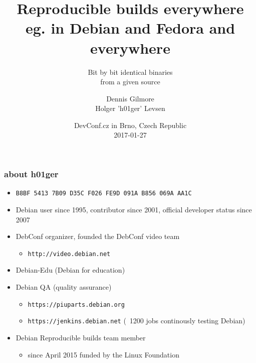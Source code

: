 \documentclass[14pt]{beamer}
\title[Reproducible Builds and Fedora]{Reproducible
builds everywhere \\ eg. in Debian and Fedora and everywhere}
\subtitle{Bit by bit identical binaries \\
from a given source}
\author[Dennis and h01ger]{%
   \texorpdfstring{
            \centering
            Dennis Gilmore\\
            Holger 'h01ger' Levsen
   }{Dennis and h01ger}}
\date[DevConf.cz]{%
 DevConf.cz in Brno, Czech Republic\\
 \small{2017-01-27}}
\newif\ifplacelogo
\begin{document}
\placelogofalse

\begin{frame}[plain]
 \titlepage
\end{frame}

\placelogotrue

\begin{frame}
 \frametitle{about h01ger}

 \begin{itemize}
  \item \small{\texttt{B8BF 5413 7B09 D35C F026  FE9D 091A B856 069A AA1C}}
  \item Debian user since 1995, contributor since 2001, official developer
  status since 2007
  \item DebConf organizer,
  founded the DebConf video team
   \begin{itemize}
    \item \texttt{http://video.debian.net}
   \end{itemize}
 \item Debian-Edu (Debian for education)
  \item Debian QA (quality assurance)
  \begin{itemize}
   \item \texttt{https://piuparts.debian.org}
   \item \texttt{https://jenkins.debian.net} (~1200 jobs continously testing Debian)
  \end{itemize}
  \item Debian Reproducible builds team member
  \begin{itemize}
   \item since April 2015 funded by the Linux Foundation
 \end{itemize}
 \end{itemize}
\end{frame}

\placelogofalse
\end{document}
